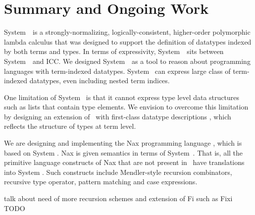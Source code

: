 \section{Summary and Ongoing Work} \label{sec:concl}
System~\Fi\ is a strongly-normalizing, logically-consistent, higher-order
polymorphic lambda calculus that was designed to support the
definition of datatypes indexed by both terms and types.
In terms of expressivity, System~\Fi\ sits between System~\Fw\ and ICC.
We designed System~\Fi\ as a tool to reason about programming
languages with term-indexed datatypes. System \Fi\ can express
large class of term-indexed datatypes, even including nested term
indices.

One limitation of System \Fi\ is that it cannot express type level
data structures such as lists that contain type elements.
We envision to overcome this limitation by designing an extension of \Fi\
with first-class datatype descriptions \cite{DagMcb12}, which reflects
the structure of types at term level.

We are designing and implementing the Nax programming language
\cite{AhnSheFioPit12}, which is based on System \Fi.
Nax is given semantics in terms of System~\Fi.
That is, all the primitive language constructs of Nax
that are not present in \Fi\ have translations into System \Fi.
Such constructs include Mendler-style recursion combinators,
recursive type operator, pattern matching and case expressions.

talk about need of more recursion schemes and extension of Fi such as Fixi
TODO

